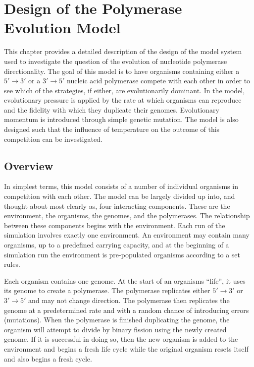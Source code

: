 \chapter{Design of the Polymerase Evolution Model} %
\label{cha:design_of_the_polymerase_evolution_model}
This chapter provides a detailed description of the design of the model system used to investigate the question of the evolution of nucleotide polymerase directionality. The goal of this model is to have organisms containing either a $5'\to3'$ or a $3'\to5'$ nucleic acid polymerase compete with each other in order to see which of the strategies, if either, are evolutionarily dominant. In the model, evolutionary pressure is applied by the rate at which organisms can reproduce and the fidelity with which they duplicate their genomes. Evolutionary momentum is introduced through simple genetic mutation. The model is also designed such that the influence of temperature on the outcome of this competition can be investigated.

\section*{Overview} %
\label{sec:overview}
In simplest terms, this model consists of a number of individual organisms in competition with each other. The model can be largely divided up into, and thought about most clearly as, four interacting components. These are the environment, the organisms, the genomes, and the polymerases. The relationship between these components begins with the environment. Each run of the simulation involves exactly one environment. An environment may contain many organisms, up to a predefined carrying capacity, and at the beginning of a simulation run the environment is pre-populated organisms according to a set rules.

Each organism contains one genome. At the start of an organisms ``life'', it uses its genome to create a polymerase. The polymerase replicates either $5'\to3'$ or $3'\to5'$ and may not change direction. The polymerase then replicates the genome at a predetermined rate and with a random chance of introducing errors (mutations). When the polymerase is finished duplicating the genome, the organism will attempt to divide by binary fission using the newly created genome. If it is successful in doing so, then the new organism is added to the environment and begins a fresh life cycle while the original organism resets itself and also begins a fresh cycle.

